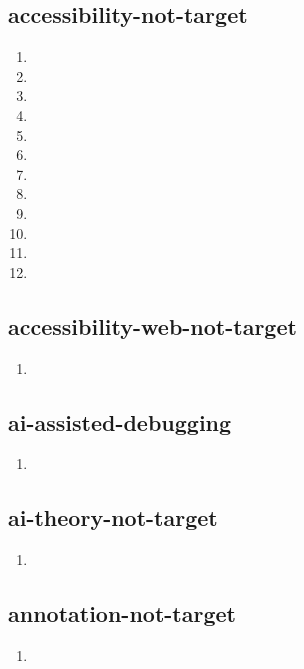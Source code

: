 \documentclass{article}
\begin{document}
\subsection{accessibility-not-target}
\begin{enumerate}
\item {}
\item {}
\item {}
\item {}
\item {}
\item {}
\item {}
\item {}
\item {}
\item {}
\item {}
\item {}
\end{enumerate}

\subsection{accessibility-web-not-target}
\begin{enumerate}
\item {}
\end{enumerate}

\subsection{ai-assisted-debugging}
\begin{enumerate}
\item {}
\end{enumerate}

\subsection{ai-theory-not-target}
\begin{enumerate}
\item {}
\end{enumerate}

\subsection{annotation-not-target}
\begin{enumerate}
\item {}
\end{enumerate}
\end{document}
